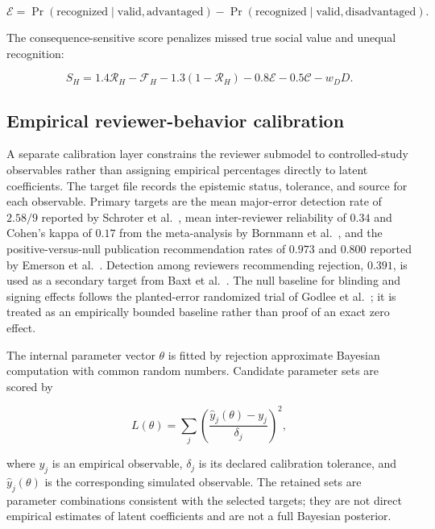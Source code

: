 \begin{equation}
\mathcal{E}
=
\Pr(\mathrm{recognized}\mid\mathrm{valid,advantaged})
-
\Pr(\mathrm{recognized}\mid\mathrm{valid,disadvantaged}).
\end{equation}

The consequence-sensitive score penalizes missed true social value and unequal recognition:

\begin{equation}
S_H
=1.4\mathcal{R}_H
-\mathcal{F}_H
-1.3(1-\mathcal{R}_H)
-0.8\mathcal{E}
-0.5\mathcal{C}
-w_DD.
\end{equation}

\subsection{Empirical reviewer-behavior calibration}

A separate calibration layer constrains the reviewer submodel to controlled-study observables rather than assigning empirical percentages directly to latent coefficients. The target file records the epistemic status, tolerance, and source for each observable. Primary targets are the mean major-error detection rate of $2.58/9$ reported by Schroter et al.~\cite{schroter2008}, mean inter-reviewer reliability of $0.34$ and Cohen's kappa of $0.17$ from the meta-analysis by Bornmann et al.~\cite{bornmann2010}, and the positive-versus-null publication recommendation rates of $0.973$ and $0.800$ reported by Emerson et al.~\cite{emerson2010}. Detection among reviewers recommending rejection, $0.391$, is used as a secondary target from Baxt et al.~\cite{baxt1998}. The null baseline for blinding and signing effects follows the planted-error randomized trial of Godlee et al.~\cite{godlee1998}; it is treated as an empirically bounded baseline rather than proof of an exact zero effect.

The internal parameter vector $\theta$ is fitted by rejection approximate Bayesian computation with common random numbers. Candidate parameter sets are scored by

\begin{equation}
L(\theta)=\sum_j
\left(
\frac{\widehat y_j(\theta)-y_j}{\delta_j}
\right)^2,
\end{equation}

where $y_j$ is an empirical observable, $\delta_j$ is its declared calibration tolerance, and $\widehat y_j(\theta)$ is the corresponding simulated observable. The retained sets are parameter combinations consistent with the selected targets; they are not direct empirical estimates of latent coefficients and are not a full Bayesian posterior.

